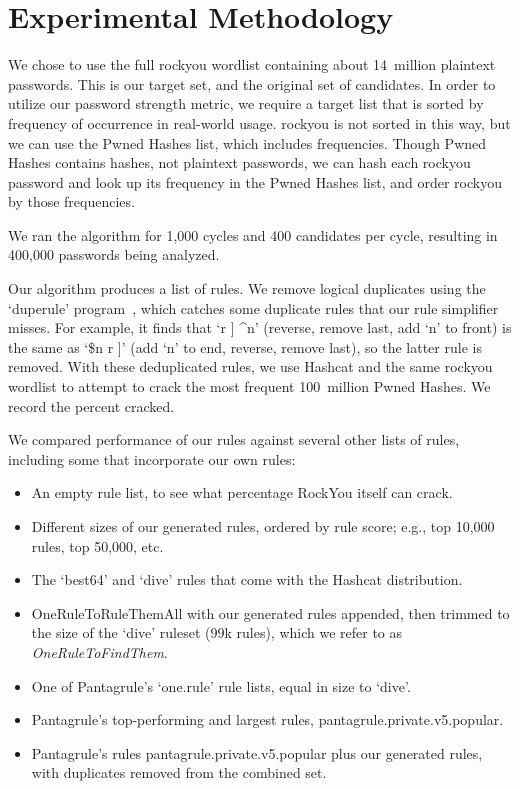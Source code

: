 \documentclass[letterpaper,twocolumn,10pt]{article}
\begin{document}
\section{Experimental Methodology}
\label{sec:methodology}

We chose to use the full rockyou wordlist containing about 14~million plaintext
passwords. This is our target set, and the original set of candidates. In order
to utilize our password strength metric, we require a target list that is
sorted by frequency of occurrence in real-world usage. rockyou is not sorted in
this way, but we can use the Pwned Hashes list, which includes frequencies.
Though Pwned Hashes contains hashes, not plaintext passwords, we can hash each
rockyou password and look up its frequency in the Pwned Hashes list, and order
rockyou by those frequencies.

We ran the algorithm for 1,000 cycles and 400 candidates per cycle, resulting
in 400,000 passwords being analyzed.

Our algorithm produces a list of rules. We remove logical duplicates using the `duperule' program~\cite{duprule}, which catches some duplicate rules that our rule simplifier misses. For example, it finds that `r ] \^{}n' (reverse, remove last, add `n' to front) is the same as `\$n r ]' (add `n' to end, reverse, remove last), so the latter rule is removed. With these deduplicated rules, we use Hashcat and the same rockyou wordlist to attempt to crack the most frequent 100~million Pwned Hashes. We record the percent cracked.

We compared performance of our rules against several other lists of rules,
including some that incorporate our own rules:

\begin{itemize}
\item An empty rule list, to see what percentage RockYou itself can crack.
\item Different sizes of our generated rules, ordered by rule score; e.g., top
10,000 rules, top 50,000, etc.
\item The `best64' and `dive' rules that come with the Hashcat distribution.
\item OneRuleToRuleThemAll with our generated rules appended, then trimmed to the size of the `dive' ruleset (99k rules), which we refer to as \textit{OneRuleToFindThem}.
\item One of Pantagrule's `one.rule' rule lists, equal in size to `dive'.
\item Pantagrule's top-performing and largest rules, pantagrule.private.v5.popular.
\item Pantagrule's rules pantagrule.private.v5.popular plus our generated rules, with duplicates removed from the combined set.
\end{itemize}
\end{document}
